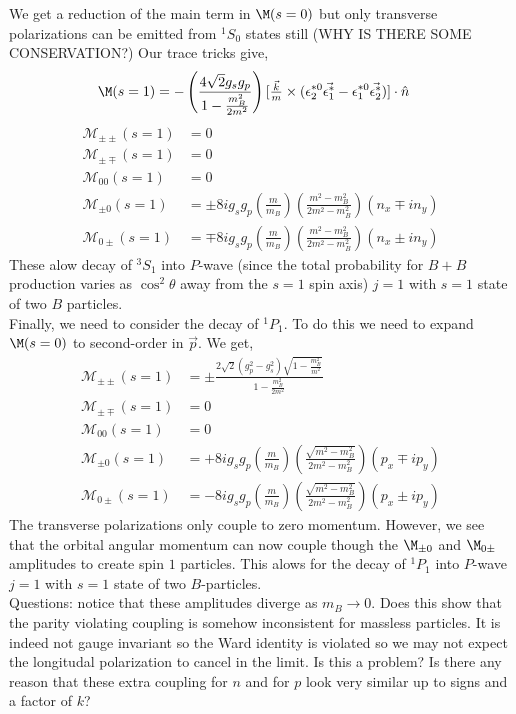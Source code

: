 \documentclass[12pt]{article}
\newcommand{\cM}{\mathcal{M}}
\begin{document}
We get a reduction of the main term in $\M(s = 0)$ but only transverse polarizations can be emitted from ${}^1 S_0$ states still (WHY IS THERE SOME CONSERVATION?) Our trace tricks give,
\begin{align*}
\M(s=1) & = - \left( \frac{4 \sqrt{2} g_s g_p}{1 - \frac{m_B^2}{2m^2}} \right)  [ \tfrac{\vec{k}}{m} \times ( \epsilon_2^{*0}  \vec{\epsilon_1^*} - \epsilon_1^{*0} \vec{\epsilon_2^*})] \cdot \hat{n}
\end{align*}
\begin{align*}
\cM_{\pm \pm}(s = 1) & = 0
\\
\cM_{\pm \mp}(s = 1) & = 0
\\
\cM_{0 0}(s = 1) & = 0
\\
\cM_{\pm 0}(s = 1) & = \pm 8 i g_s g_p \left( \frac{m}{m_B} \right) \left( \frac{m^2 - m_B^2}{2m^2 - m_B^2} \right) (n_x \mp i n_y) 
\\
\cM_{0 \pm}(s = 1) & = \mp 8 i g_s g_p \left( \frac{m}{m_B} \right) \left( \frac{m^2 - m_B^2}{2m^2 - m_B^2} \right) (n_x \pm i n_y) 
\end{align*}
These alow decay of ${}^3 S_1$ into $P$-wave (since the total probability for $B + B$ production varies as $\cos^2{\theta}$ away from the $s = 1$ spin axis) $j = 1$ with $s = 1$ state of two $B$ particles.
\bigskip\\
Finally, we need to consider the decay of ${}^1 P_1$. To do this we need to expand $\M(s = 0)$ to second-order in $\vec{p}$. We get,
\begin{align*}
\cM_{\pm \pm}(s = 1) & = \pm \frac{2 \sqrt{2} (g_p^2 - g_s^2) \sqrt{1 - \frac{m_B^2}{m^2}}}{1 - \frac{m_B^2}{2m^2}} 
\\
\cM_{\pm \mp}(s = 1) & = 0
\\
\cM_{0 0}(s = 1) & = 0
\\
\cM_{\pm 0}(s = 1) & = + 8 i g_s g_p \left( \frac{m}{m_B} \right) \left( \frac{\sqrt{m^2 - m_B^2}}{2m^2 - m_B^2} \right) (p_x \mp i p_y) 
\\
\cM_{0 \pm}(s = 1) & = - 8 i g_s g_p \left( \frac{m}{m_B} \right) \left( \frac{\sqrt{m^2 - m_B^2}}{2m^2 - m_B^2} \right) (p_x \pm i p_y) 
\end{align*}
The transverse polarizations only couple to zero momentum. However, we see that the orbital angular momentum can now couple though the $\M_{\pm 0}$ and $\M_{0 \pm}$ amplitudes to create spin $1$ particles. This alows for the decay of ${}^1 P_1$ into $P$-wave $j = 1$ with $s = 1$ state of two $B$-particles.
\bigskip\\
Questions: notice that these amplitudes diverge as $m_B \to 0$. Does this show that the parity violating coupling is somehow inconsistent for massless particles. It is indeed not gauge invariant so the Ward identity is violated so we may not expect the longitudal polarization to cancel in the limit. Is this a problem? Is there any reason that these extra coupling for $n$ and for $p$ look very similar up to signs and a factor of $k$?
\end{document}

